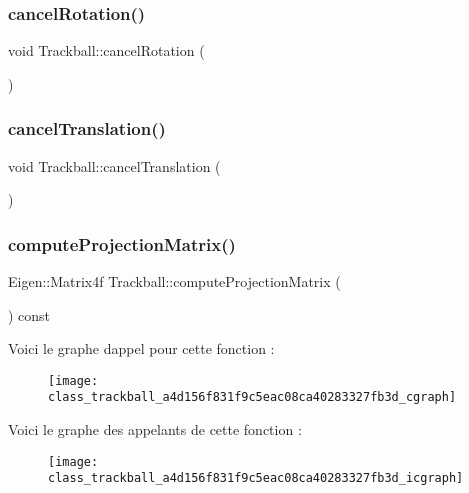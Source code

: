 \subsubsection{\texorpdfstring{cancel\+Rotation()}{cancelRotation()}}
{\footnotesize\ttfamily void Trackball\+::cancel\+Rotation (\begin{DoxyParamCaption}{ }\end{DoxyParamCaption})}

\mbox{\label{class_trackball_a0666f601bf5171b96051074a59a3df73}} 
\subsubsection{\texorpdfstring{cancel\+Translation()}{cancelTranslation()}}
{\footnotesize\ttfamily void Trackball\+::cancel\+Translation (\begin{DoxyParamCaption}{ }\end{DoxyParamCaption})}

\mbox{\label{class_trackball_a4d156f831f9c5eac08ca40283327fb3d}} 
\subsubsection{\texorpdfstring{compute\+Projection\+Matrix()}{computeProjectionMatrix()}}
{\footnotesize\ttfamily Eigen\+::\+Matrix4f Trackball\+::compute\+Projection\+Matrix (\begin{DoxyParamCaption}{ }\end{DoxyParamCaption}) const}

Voici le graphe d\textquotesingle{}appel pour cette fonction \+:\nopagebreak
\begin{figure}[H]
\begin{center}
\leavevmode
\texttt{[image: class\_trackball\_a4d156f831f9c5eac08ca40283327fb3d\_cgraph]}
\end{center}
\end{figure}
Voici le graphe des appelants de cette fonction \+:\nopagebreak
\begin{figure}[H]
\begin{center}
\leavevmode
\texttt{[image: class\_trackball\_a4d156f831f9c5eac08ca40283327fb3d\_icgraph]}
\end{center}
\end{figure}
\mbox{\label{class_trackball_af3a13b098e2bb5af29c2ef295969ba25}} 

